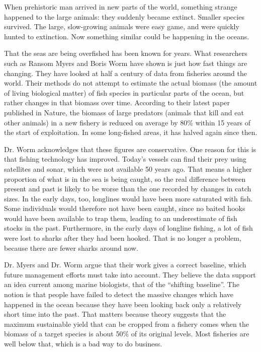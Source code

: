 When prehistoric man arrived in new parts of the world, something strange happened to the large animals: they suddenly became extinct. Smaller species survived. The large, slow-growing animals were easy game, and were quickly hunted to extinction. Now something similar could be happening in the oceans.


That the seas are being overfished has been known for years. What researchers such as Ransom Myers and Boris Worm have shown is just how fast things are changing. They have looked at half a century of data from fisheries around the world. Their methods do not attempt to estimate the actual biomass (the amount of living biological matter) of fish species in particular parts of the ocean, but rather changes in that biomass over time. According to their latest paper published in Nature, the biomass of large predators (animals that kill and eat other animals) in a new fishery is reduced on average by 80\% within 15 years of the start of exploitation. In some long-fished areas, it has halved again since then.


Dr. Worm acknowledges that these figures are conservative. One reason for this is that fishing technology has improved. Today's vessels can find their prey using satellites and sonar, which were not available 50 years ago. That means a higher proportion of what is in the sea is being caught, so the real difference between present and past is likely to be worse than the one recorded by changes in catch sizes. In the early days, too, longlines would have been more saturated with fish. Some individuals would therefore not have been caught, since no baited hooks would have been available to trap them, leading to an underestimate of fish stocks in the past. Furthermore, in the early days of longline fishing, a lot of fish were lost to sharks after they had been hooked. That is no longer a problem, because there are fewer sharks around now.


Dr. Myers and Dr. Worm argue that their work gives a correct baseline, which future management efforts must take into account. They believe the data support an idea current among marine biologists, that of the ``shifting baseline''. The notion is that people have failed to detect the massive changes which have happened in the ocean because they have been looking back only a relatively short time into the past. That matters because theory suggests that the maximum sustainable yield that can be cropped from a fishery comes when the biomass of a target species is about 50\% of its original levels. Most fisheries are well below that, which is a bad way to do business.